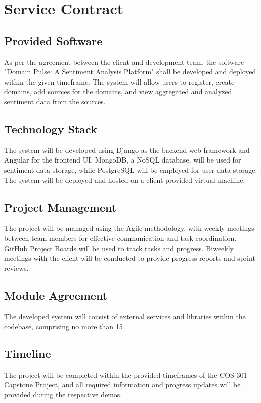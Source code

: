 \documentclass[12pt]{article}
\begin{document}
\newpage

\section{Service Contract}

\subsection{Provided Software}
As per the agreement between the client and development team, the software "Domain Pulse: A Sentiment Analysis Platform" shall be developed and deployed within the given timeframe. The system will allow users to register, create domains, add sources for the domains, and view aggregated and analyzed sentiment data from the sources.

\subsection{Technology Stack}
The system will be developed using Django as the backend web framework and Angular for the frontend UI. MongoDB, a NoSQL database, will be used for sentiment data storage, while PostgreSQL will be employed for user data storage. The system will be deployed and hosted on a client-provided virtual machine.

\subsection{Project Management}
The project will be managed using the Agile methodology, with weekly meetings between team members for effective communication and task coordination. GitHub Project Boards will be used to track tasks and progress. Biweekly meetings with the client will be conducted to provide progress reports and sprint reviews.

\subsection{Module Agreement}
The developed system will consist of external services and libraries within the codebase, comprising no more than 15%

\subsection{Timeline}
The project will be completed within the provided timeframes of the COS 301 Capstone Project, and all required information and progress updates will be provided during the respective demos.
\end{document}
